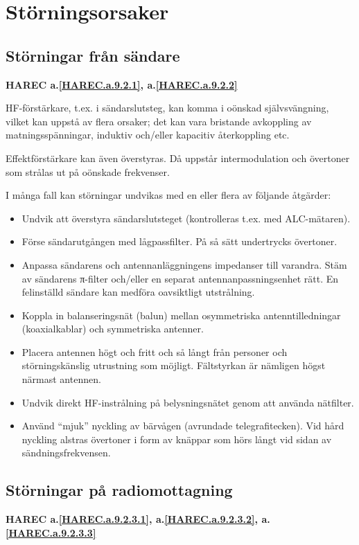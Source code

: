 \section{Störningsorsaker}

\subsection{Störningar från sändare}
\textbf{
HAREC a.\ref{HAREC.a.9.2.1}\label{myHAREC.a.9.2.1},
 a.\ref{HAREC.a.9.2.2}\label{myHAREC.a.9.2.2}
}

HF-förstärkare, t.ex. i sändarslutsteg, kan komma i oönskad
självsvängning, vilket kan uppstå av flera orsaker; det kan vara
bristande avkoppling av matningsspänningar, induktiv och/eller
kapacitiv återkoppling etc.

Effektförstärkare kan även överstyras.  Då uppstår intermodulation och
övertoner som strålas ut på oönskade frekvenser.

I många fall kan störningar undvikas med en eller flera av följande
åtgärder:
\begin{itemize}
\item Undvik att överstyra sändarslutsteget (kontrolleras t.ex. med
  ALC-mätaren).
\item Förse sändarutgången med lågpassfilter.  På så sätt undertrycks
  övertoner.
\item Anpassa sändarens och antennanläggningens impedanser till
  varandra. Stäm av sändarens π-filter och/eller en separat
  antennanpassningsenhet rätt. En felinställd sändare kan medföra
  oavsiktligt utstrålning.
\item Koppla in balanseringsnät (balun) mellan osymmetriska
  antenntilledningar (koaxialkablar) och symmetriska antenner.
\item Placera antennen högt och fritt och så långt från personer och
  störningskänslig utrustning som möjligt. Fältstyrkan är nämligen
  högst närmast antennen.
\item Undvik direkt HF-instrålning på belysningsnätet genom att
  använda nätfilter.
\item Använd ``mjuk'' nyckling av bärvågen (avrundade
  telegrafitecken). Vid hård nyckling alstras övertoner i form av
  knäppar som hörs långt vid sidan av sändningsfrekvensen.
\end{itemize}

\subsection{Störningar på radiomottagning}
\textbf{
HAREC a.\ref{HAREC.a.9.2.3.1}\label{myHAREC.a.9.2.3.1},
 a.\ref{HAREC.a.9.2.3.2}\label{myHAREC.a.9.2.3.2},
 a.\ref{HAREC.a.9.2.3.3}\label{myHAREC.a.9.2.3.3}
}

